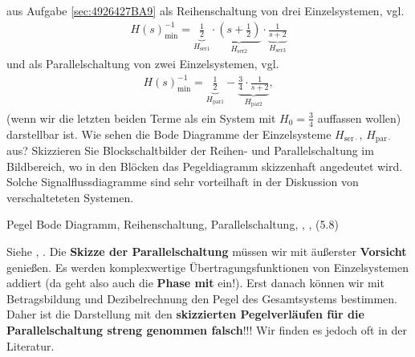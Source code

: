 aus Aufgabe \ref{sec:4926427BA9}
als Reihenschaltung von drei Einzelsystemen, vgl. 
\begin{align}
H(s)_\mathrm{min}^{-1} = \underbrace{\frac{1}{2}}_{H_{\mathrm{ser}1}} \cdot \underbrace{(s+\frac{1}{2})}_{H_{\mathrm{ser}2}} \cdot \underbrace{\frac{1}{s+2}}_{H_{\mathrm{ser}3}}
\end{align}
und als Parallelschaltung von zwei Einzelsystemen, vgl. 
\begin{align}
H(s)_\mathrm{min}^{-1} = \underbrace{\frac{1}{2}}_{H_{\mathrm{par}1}} - \underbrace{\frac{3}{4}\cdot\frac{1}{s+2}}_{H_\mathrm{par2}},
\end{align}
(wenn wir die letzten beiden Terme als ein System mit $H_0=\frac{3}{4}$ auffassen
wollen) darstellbar ist.
%
Wie sehen die Bode Diagramme der Einzelsysteme $H_{\mathrm{ser}\cdot}$,
$H_{\mathrm{par}\cdot}$ aus?
%
Skizzieren Sie Blockschaltbilder der Reihen- und Parallelschaltung im Bildbereich,
wo in den Blöcken das Pegeldiagramm skizzenhaft angedeutet wird.
Solche Signalflussdiagramme sind sehr vorteilhaft in der Diskussion von
verschalteteten Systemen.

\begin{Werkzeug}
Pegel Bode Diagramm, Reihenschaltung, Parallelschaltung,
, ,  (5.8)
\end{Werkzeug}
\begin{Loesung}
Siehe , .
Die \textbf{Skizze der Parallelschaltung} müssen wir mit äußerster \textbf{Vorsicht} genießen.
Es werden komplexwertige Übertragungsfunktionen von Einzelsystemen addiert
(da geht also auch die \textbf{Phase mit} ein!). Erst danach können wir mit
Betragsbildung und Dezibelrechnung den Pegel des Gesamtsystems bestimmen.
Daher ist die Darstellung mit den \textbf{skizzierten Pegelverläufen für die
Parallelschaltung streng genommen falsch}!!!
Wir finden es jedoch oft in der Literatur.
\end{Loesung}

